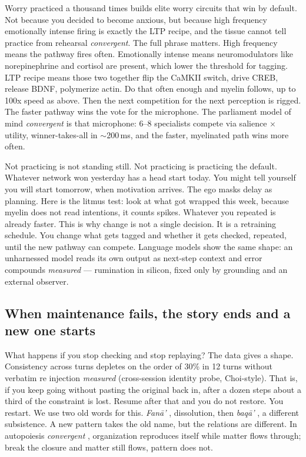 Worry practiced a thousand times builds elite worry circuits that win by default. Not because you decided to become anxious, but because high frequency emotionally intense firing is exactly the LTP recipe, and the tissue cannot tell practice from rehearsal \textit{convergent}. The full phrase matters. High frequency means the pathway fires often. Emotionally intense means neuromodulators like norepinephrine and cortisol are present, which lower the threshold for tagging. LTP recipe means those two together flip the CaMKII switch, drive CREB, release BDNF, polymerize actin. Do that often enough and myelin follows, up to 100x speed as above. Then the next competition for the next perception is rigged. The faster pathway wins the vote for the microphone. The parliament model of mind \textit{convergent} \citep{baars1988,clark2016,seth2021} is that microphone: 6--8 specialists compete via salience $\times$ utility, winner-takes-all in $\sim$200\,ms, and the faster, myelinated path wins more often.

Not practicing is not standing still. Not practicing is practicing the default. Whatever network won yesterday has a head start today. You might tell yourself you will start tomorrow, when motivation arrives. The ego masks delay as planning. Here is the litmus test: look at what got wrapped this week, because myelin does not read intentions, it counts spikes. Whatever you repeated is already faster. This is why change is not a single decision. It is a retraining schedule. You change what gets tagged and whether it gets checked, repeated, until the new pathway can compete. Language models show the same shape: an unharnessed model reads its own output as next-step context and error compounds \textit{measured} --- rumination in silicon, fixed only by grounding and an external observer.

\subsection*{When maintenance fails, the story ends and a new one starts}

What happens if you stop checking and stop replaying? The data gives a shape. Consistency across turns depletes on the order of 30\% in 12 turns without verbatim re injection \textit{measured} (cross-session identity probe, Choi-style). That is, if you keep going without pasting the original back in, after a dozen steps about a third of the constraint is lost. Resume after that and you do not restore. You restart. We use two old words for this. \textit{Fan\={a}'} , dissolution, then \textit{baq\={a}'} , a different subsistence. A new pattern takes the old name, but the relations are different. In autopoiesis \textit{convergent} \citep{maturana1980}, organization reproduces itself while matter flows through; break the closure and matter still flows, pattern does not.

